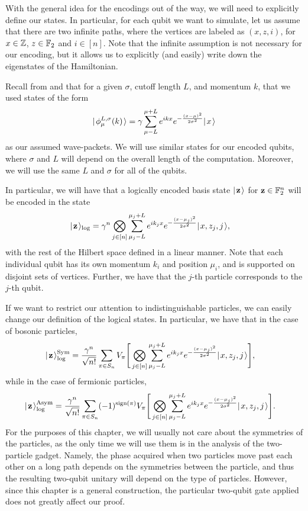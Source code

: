 \documentclass[../thesis-main/thesis-main]{subfiles}
\begin{document}
With the general idea for the encodings out of the way, we will need to explicitly define our states.  In particular, for each qubit we want to simulate, let us assume that there are two infinite paths, where the vertices are labeled as $(x,z,i)$, for $x\in \mathbb{Z}$, $z\in \mathbb{F}_2$ and $i\in[n]$.  Note that the infinite assumption is not necessary for our encoding, but it allows us to explicitly (and easily) write down the eigenstates of the Hamiltonian.

Recall from  and  that for a given $\sigma$, cutoff length $L$, and momentum $k$, that we used states of the form
\begin{align}
    |\mspace{2mu} \phi_\mu^{L,\sigma}(k) \mspace{2mu} \rangle = \gamma \sum_{\mu - L}^{\mu + L} e^{ikx} e^{-\frac{(x-\mu)^2}{2\sigma^2}} |\mspace{2mu} x \mspace{2mu} \rangle
\end{align}
as our assumed wave-packets.  We will use similar states for our encoded qubits, where $\sigma$ and $L$ will depend on the overall length of the computation.  Moreover, we will use the same $L$ and $\sigma$ for all of the qubits.

In particular, we will have that a logically encoded basis state $|\mspace{2mu} \mathbf{z} \mspace{2mu} \rangle$ for $\mathbf{z}\in \mathbb{F}_2^n$ will be encoded in the state
\begin{align}
  |\mspace{2mu} \mathbf{z} \mspace{2mu} \rangle_{\text{log}} &= \gamma^n \bigotimes_{j\in [n]} \sum_{\mu_j-L}^{\mu_j+L} e^{i k_j x} e^{- \frac{(x - \mu_j)^2}{2\sigma^2}} |\mspace{2mu} x,z_j,j \mspace{2mu} \rangle,\label{eq:MP_u_logical states}
\end{align}
with the rest of the Hilbert space defined in a linear manner.  Note that each individual qubit has its own momentum $k_i$ and position $\mu_i$, and is supported on disjoint sets of vertices.  Further, we have that the $j$-th particle corresponds to the $j$-th qubit.

If we want to restrict our attention to indistinguishable particles, we can easily change our definition of the logical states.  In particular, we have that in the case of bosonic particles,
\begin{align}
  |\mspace{2mu} \mathbf{z} \mspace{2mu} \rangle_{\text{log}}^{\operatorname{Sym}} &= \frac{\gamma^n}{\sqrt{n!}}\sum_{\pi\in S_n} V_\pi \Bigg[\bigotimes_{j\in [n]} \sum_{\mu_j-L}^{\mu_j+L} e^{i k_j x} e^{- \frac{(x - \mu_j)^2}{2\sigma^2}} |\mspace{2mu} x,z_j,j \mspace{2mu} \rangle\Bigg],
\end{align}
while in the case of fermionic particles,
\begin{align}
  |\mspace{2mu} \mathbf{z} \mspace{2mu} \rangle_{\text{log}}^{\operatorname{Asym}} &= \frac{\gamma^n}{\sqrt{n!}}\sum_{\pi\in S_n} (-1)^{\operatorname{sign}(\pi)}V_\pi \Bigg[\bigotimes_{j\in [n]} \sum_{\mu_j-L}^{\mu_j+L} e^{i k_j x} e^{- \frac{(x - \mu_j)^2}{2\sigma^2}} |\mspace{2mu} x,z_j,j \mspace{2mu} \rangle\Bigg].
\end{align}
For the purposes of this chapter, we will usually not care about the symmetries of the particles, as the only time we will use them is in the analysis of the two-particle gadget.  Namely, the phase acquired when two particles move past each other on a long path depends on the symmetries between the particle, and thus the resulting two-qubit unitary will depend on the type of particles.  However, since this chapter is a general construction, the particular two-qubit gate applied does not greatly affect our proof.
\end{document}
